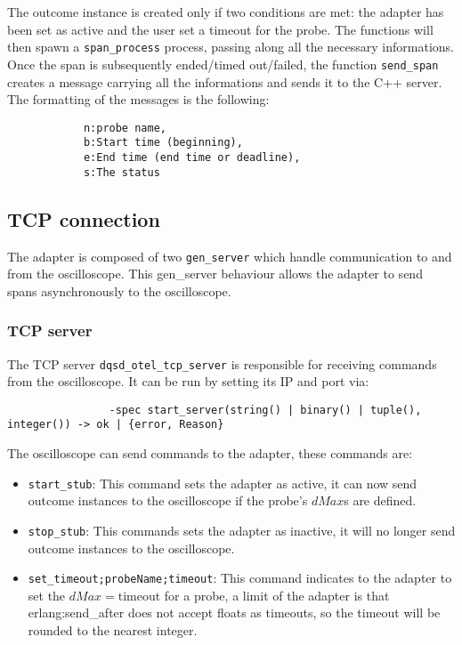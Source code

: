             The outcome instance is created only if two conditions are met: the adapter has been set as active and the user set a timeout for the probe. The functions will then spawn a \texttt{span\_process} process, passing along all the necessary informations. \\
        Once the span is subsequently ended/timed out/failed, the function \texttt{send\_span} creates a message carrying all the informations and sends it to the C++ server. The formatting of the messages is the following:
        \begin{verbatim}
            n:probe name,
            b:Start time (beginning),
            e:End time (end time or deadline),
            s:The status
        \end{verbatim}

    \subsection{TCP connection}
        The adapter is composed of two \texttt{gen\_server} which handle communication to and from the oscilloscope. This gen\_server behaviour allows the adapter to send spans asynchronously to the oscilloscope.

        \subsubsection{TCP server}
            The TCP server \texttt{dqsd\_otel\_tcp\_server} is responsible for receiving commands from the oscilloscope. It can be run by setting its IP and port via:
            \begin{verbatim}
                -spec start_server(string() | binary() | tuple(), integer()) -> ok | {error, Reason}
            \end{verbatim}
            The oscilloscope can send commands to the adapter, these commands are:
            \begin{itemize}
                \item \texttt{start\_stub}: This command sets the adapter as active, it can now send outcome instances to the oscilloscope if the probe's $dMax$s are defined.
                \item \texttt{stop\_stub}: This commands sets the adapter as inactive, it will no longer send outcome instances to the oscilloscope.
                \item \texttt{set\_timeout;probeName;timeout}: This command indicates to the adapter to set the $dMax = \text{timeout}$ for a probe, a limit of the adapter is that erlang:send\_after does not accept floats as timeouts, so the timeout will be rounded to the nearest integer.
            \end{itemize}

